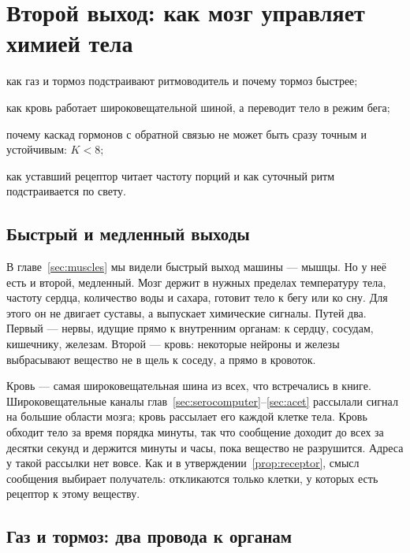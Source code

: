 \chapter{Второй выход: как мозг управляет химией тела}
\label{sec:chemoutput}
\begin{chaptergoals}
\item как газ  и тормоз  подстраивают ритмоводитель и почему тормоз быстрее;
\item как кровь работает широковещательной шиной, а  переводит тело в режим бега;
\item почему каскад гормонов с обратной связью не может быть сразу точным и устойчивым: $K<8$;
\item как уставший рецептор читает частоту порций и как суточный ритм подстраивается по свету.
\end{chaptergoals}

\section{Быстрый и медленный выходы}

В главе~\ref{sec:muscles} мы видели быстрый выход машины --- мышцы. Но у неё есть и второй, медленный. Мозг держит в нужных пределах температуру тела, частоту сердца, количество воды и сахара, готовит тело к бегу или ко сну. Для этого он не двигает суставы, а выпускает химические сигналы. Путей два. Первый --- нервы, идущие прямо к внутренним органам: к сердцу, сосудам, кишечнику, железам. Второй --- кровь: некоторые нейроны и железы выбрасывают вещество не в щель к соседу, а прямо в кровоток.

Кровь --- самая широковещательная шина из всех, что встречались в книге. Широковещательные каналы глав~\ref{sec:serocomputer}--\ref{sec:acet} рассылали сигнал на большие области мозга; кровь рассылает его каждой клетке тела. Кровь обходит тело за время порядка минуты, так что сообщение доходит до всех за десятки секунд и держится минуты и часы, пока вещество не разрушится. Адреса у такой рассылки нет вовсе. Как и в утверждении~\ref{prop:receptor}, смысл сообщения выбирает получатель: откликаются только клетки, у которых есть рецептор к этому веществу.

\section{Газ и тормоз: два провода к органам}

